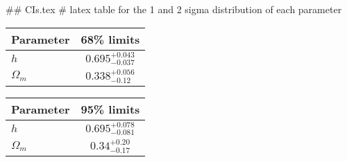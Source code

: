 ## CIs.tex
# latex table for the 1 and 2 sigma distribution of each parameter

\begin{tabular} { l  c}
 Parameter &  68\% limits\\
\hline
{\boldmath$h              $} & $0.695^{+0.043}_{-0.037}   $\\
{\boldmath$\Omega_m       $} & $0.338^{+0.056}_{-0.12}    $\\
\hline
\end{tabular}

\begin{tabular} { l  c}
 Parameter &  95\% limits\\
\hline
{\boldmath$h              $} & $0.695^{+0.078}_{-0.081}   $\\
{\boldmath$\Omega_m       $} & $0.34^{+0.20}_{-0.17}      $\\
\hline
\end{tabular}

